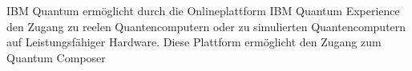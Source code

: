 IBM Quantum erm\"oglicht durch die Onlineplattform IBM Quantum Experience den Zugang zu reelen Quantencomputern oder zu simulierten Quantencomputern auf Leistungsf\"ahiger Hardware. Diese Plattform erm\"oglicht den Zugang zum Quantum Composer 
